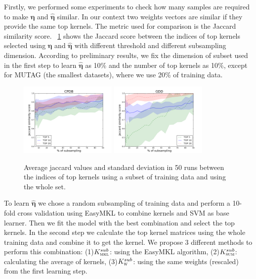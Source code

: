\documentclass{esannV2}
\newcommand{\1}{{\bf 1}}
\newcommand{\ksmkl}{$K_{\textsc{mkl}}^{sub}$}
\newcommand{\kssum}{$K_{\textsc{sum}}^{sub}$}
\newcommand{\ksw}{$K_{\textsc{w}}^{sub}$}
\begin{document}
Firstly, we performed some experiments to check how many samples are required to make $\boldsymbol{\eta}$ and $\hat{\boldsymbol{\eta}}$ similar.
In our context two weights vectors are similar if they provide the same top kernels. The metric used for comparison is the Jaccard similarity score. \figurename\ \ref{fig:jaccard} shows the Jaccard score between the indices of top kernels selected using $\boldsymbol{\eta}$ and $\hat{\boldsymbol{\eta}}$ with different threshold and different subsampling dimension.
According to preliminary results, we fix the dimension of subset used in the first step to learn $\hat{\boldsymbol{\eta}}$ as 10\% and the number of top kernels as 10\%, except for MUTAG (the smallest datasets), where we use 20\% of training data.
%
\begin{figure}[t]
\centering
\includegraphics[width=0.42\textwidth]{img/CPDBh.png}
\includegraphics[width=0.42\textwidth]{img/GDDh.png}
\caption{Average jaccard values and standard deviation in 50 runs between the indices of top kernels using a subset of training data and using the whole set.}
\label{fig:jaccard}
\end{figure}
%
To learn $\hat{\boldsymbol{\eta}}$ we chose a random subsampling of training data and perform a 10-fold cross validation using EasyMKL to combine kernels and SVM as base learner. Then we fit the model with the best combination and select the top kernels.
In the second step we calculate the top kernel matrices using the whole training data and combine it to get the kernel. We propose 3 different methods to perform this combination:
(1)\ksmkl: using the EasyMKL algorithm, (2)\kssum: calculating the average of kernels, (3)\ksw: using the same weights (rescaled) from the first learning step.
\end{document}
